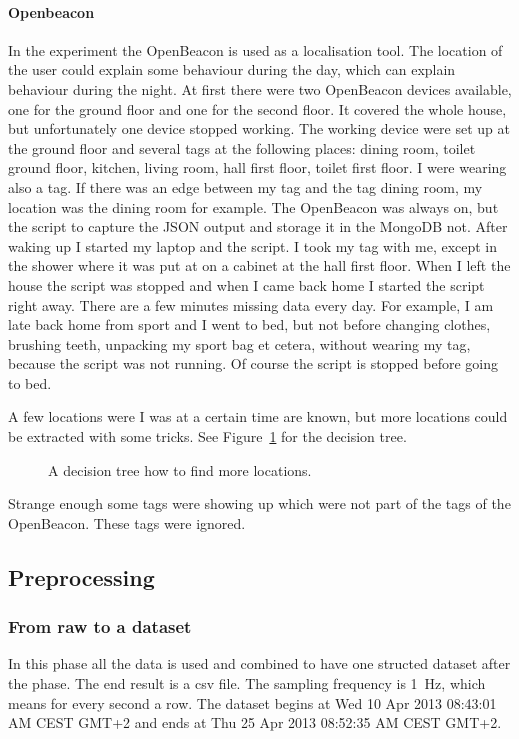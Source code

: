 		\paragraph{Openbeacon}
			In the experiment the OpenBeacon is used as a localisation tool. The location of the user could explain some behaviour during the day, which can explain behaviour during the night. At first there were two OpenBeacon devices available, one for the ground floor and one for the second floor. It covered the whole house, but unfortunately one device stopped working. The working device were set up at the ground floor and several tags at the following places: dining room, toilet ground floor, kitchen, living room, hall first floor, toilet first floor. I were wearing also a tag. If there was an edge between my tag and the tag dining room, my location was the dining room for example. The OpenBeacon was always on, but the script to capture the JSON output and storage it in the MongoDB not. After waking up I started my laptop and the script. I took my tag with me, except in the shower where it was put at on a cabinet at the hall first floor. When I left the house the script was stopped and when I came back home I started the script right away. There are a few minutes missing data every day. For example, I am late back home from sport and I went to bed, but not before changing clothes, brushing teeth, unpacking my sport bag et cetera, without wearing my tag, because the script was not running. Of course the script is stopped before going to bed.
			
			A few locations were I was at a certain time are known, but more locations could be extracted with some tricks. See Figure~\ref{fig:decisiontree} for the decision tree.

				\begin{figure}[h!]
					
					\caption{A decision tree how to find more locations.}
					\label{fig:decisiontree}
				\end{figure}

				Strange enough some tags were showing up which were not part of the tags of the OpenBeacon. These tags were ignored.
		
		\clearpage
				
	\subsection{Preprocessing}
		\label{sec:preprocessing}
		\subsubsection{From raw to a dataset}
			\label{sec:rawdataset}
			In this phase all the data is used and combined to have one structed dataset after the phase. The end result is a csv file. The sampling frequency is \SI{1}{\hertz}, which means for every second a row. The dataset begins at Wed 10 Apr 2013 08:43:01 AM CEST GMT+2 and ends at Thu 25 Apr 2013 08:52:35 AM CEST GMT+2. 
			
